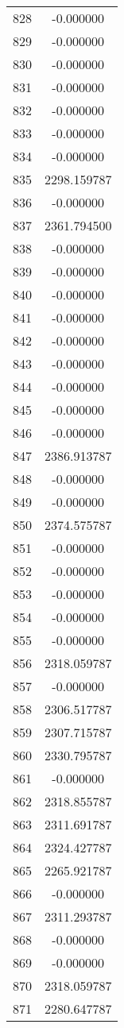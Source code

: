 \documentclass[12pt]{article}
\begin{document}
\begin{longtable}{@{}cc@{}}
828 & -0.000000 \\
829 & -0.000000 \\
830 & -0.000000 \\
831 & -0.000000 \\
832 & -0.000000 \\
833 & -0.000000 \\
834 & -0.000000 \\
835 & 2298.159787 \\
836 & -0.000000 \\
837 & 2361.794500 \\
838 & -0.000000 \\
839 & -0.000000 \\
840 & -0.000000 \\
841 & -0.000000 \\
842 & -0.000000 \\
843 & -0.000000 \\
844 & -0.000000 \\
845 & -0.000000 \\
846 & -0.000000 \\
847 & 2386.913787 \\
848 & -0.000000 \\
849 & -0.000000 \\
850 & 2374.575787 \\
851 & -0.000000 \\
852 & -0.000000 \\
853 & -0.000000 \\
854 & -0.000000 \\
855 & -0.000000 \\
856 & 2318.059787 \\
857 & -0.000000 \\
858 & 2306.517787 \\
859 & 2307.715787 \\
860 & 2330.795787 \\
861 & -0.000000 \\
862 & 2318.855787 \\
863 & 2311.691787 \\
864 & 2324.427787 \\
865 & 2265.921787 \\
866 & -0.000000 \\
867 & 2311.293787 \\
868 & -0.000000 \\
869 & -0.000000 \\
870 & 2318.059787 \\
871 & 2280.647787 \\

\end{longtable}
\end{document}
